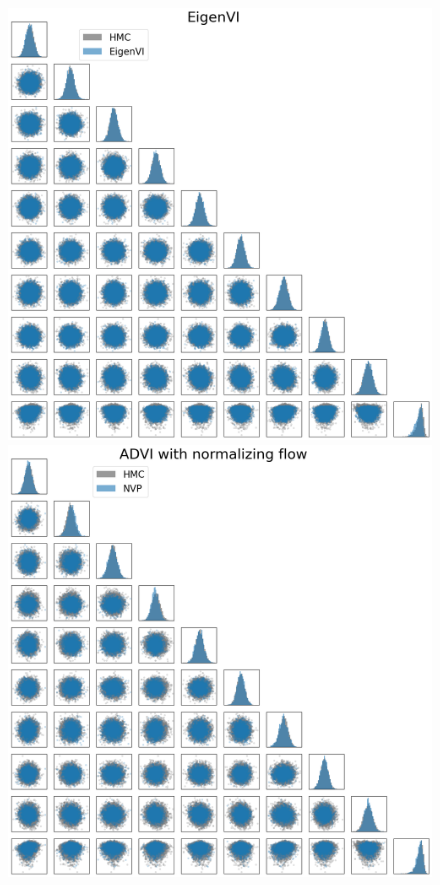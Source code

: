 \begin{figure}
    \centering
    \includegraphics[scale=0.23]{figs/expts-pdb/PDB_85_corner_eigenvi.png}
    \\
    \includegraphics[scale=0.23]{figs/expts-pdb/PDB_85_corner_flows.png}

\end{figure}
